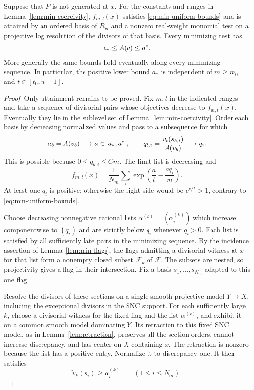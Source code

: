 \begin{proposition}
\label{prop:minimizers}
Suppose that $P$ is not generated at $x$. For the constants and ranges
in Lemma~\ref{lem:min-coercivity}, $f_{m,t}(x)$ satisfies
\eqref{eq:min-uniform-bounds} and is attained by an ordered basis
of $R_m$ and a nonzero real-weight monomial test on a projective log
resolution of the divisors of that basis. Every minimizing test has
\[
 a_*\leq A(v)\leq a^*.
\]
More generally the same bounds hold eventually along every minimizing
sequence. In particular, the positive lower bound $a_*$ is independent
of $m\geq m_0$ and $t\in[t_0,n+1]$.
\end{proposition}

\begin{proof}
Only attainment remains to be proved. Fix $m,t$ in the indicated
ranges and take a sequence of divisorial pairs whose objectives
decrease to $f_{m,t}(x)$. Eventually they lie in the sublevel set of
Lemma~\ref{lem:min-coercivity}. Order each basis by decreasing
normalized values and pass to a subsequence for which
\[
 a_b=A(v_b)\longrightarrow a\in[a_*,a^*],\qquad
 q_{b,i}=\frac{v_b(s_{b,i})}{A(v_b)}\longrightarrow q_i.
\]
This is possible because $0\leq q_{b,i}\leq Cm$. The limit list is
decreasing and
\begin{equation}
\label{eq:min-limit-objective}
 f_{m,t}(x)=\frac1{N_m}\sum_i
       \exp\!\left(\frac at-\frac{aq_i}m\right).
\end{equation}
At least one $q_i$ is positive: otherwise the right side would be
$e^{a/t}>1$, contrary to \eqref{eq:min-uniform-bounds}.

Choose decreasing nonnegative rational lists
$\alpha^{(k)}=(\alpha_i^{(k)})$ which increase componentwise to
$(q_i)$ and are strictly below $q_i$ whenever $q_i>0$. Each list is
satisfied by all sufficiently late pairs in the minimizing sequence.
By the incidence assertion of Lemma~\ref{lem:min-flags}, the flags
admitting a divisorial witness at $x$ for that list form a nonempty
closed subset $\mathcal F_k$ of $\mathcal F$. The subsets are nested,
so projectivity gives a flag in their intersection. Fix a basis
$s_1,\ldots,s_{N_m}$ adapted to this one flag.

Resolve the divisors of these sections on a single smooth projective
model $Y\longrightarrow X$, including the exceptional divisors in
the SNC support. For each sufficiently large $k$, choose a divisorial
witness for the fixed flag and the list $\alpha^{(k)}$, and exhibit it
on a common smooth model dominating $Y$. Its retraction
to this fixed SNC model, as in Lemma~\ref{lem:retraction}, preserves
all the section orders, cannot increase discrepancy, and has center
on $X$ containing $x$. The retraction is nonzero because the list
has a positive entry. Normalize it to discrepancy one. It then
satisfies
\begin{equation}
\label{eq:min-retracted-lists}
 \widetilde v_k(s_i)\geq\alpha_i^{(k)}
       \qquad(1\leq i\leq N_m).
\end{equation}


\end{proof}
